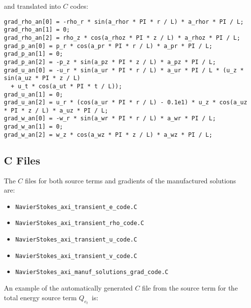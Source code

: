 \documentclass[10pt]{article}
\begin{document}
 and translated into $C$ codes:
\begin{small}
 \begin{verbatim}
grad_rho_an[0] = -rho_r * sin(a_rhor * PI * r / L) * a_rhor * PI / L;
grad_rho_an[1] = 0;
grad_rho_an[2] = rho_z * cos(a_rhoz * PI * z / L) * a_rhoz * PI / L;
grad_p_an[0] = p_r * cos(a_pr * PI * r / L) * a_pr * PI / L;
grad_p_an[1] = 0;
grad_p_an[2] = -p_z * sin(a_pz * PI * z / L) * a_pz * PI / L;
grad_u_an[0] = -u_r * sin(a_ur * PI * r / L) * a_ur * PI / L * (u_z * sin(a_uz * PI * z / L)
  + u_t * cos(a_ut * PI * t / L));
grad_u_an[1] = 0;
grad_u_an[2] = u_r * (cos(a_ur * PI * r / L) - 0.1e1) * u_z * cos(a_uz * PI * z / L) * a_uz * PI / L;
grad_w_an[0] = -w_r * sin(a_wr * PI * r / L) * a_wr * PI / L;
grad_w_an[1] = 0;
grad_w_an[2] = w_z * cos(a_wz * PI * z / L) * a_wz * PI / L;
\end{verbatim}
\end{small}


\subsection{C Files}
The $C$ files for both source terms and gradients of the  manufactured solutions are:
\begin{itemize}
\item \texttt{NavierStokes\_axi\_transient\_e\_code.C}
 \item \texttt{NavierStokes\_axi\_transient\_rho\_code.C}
 \item \texttt{NavierStokes\_axi\_transient\_u\_code.C}
 \item \texttt{NavierStokes\_axi\_transient\_v\_code.C}
 \item \texttt{NavierStokes\_axi\_manuf\_solutions\_grad\_code.C}
\end{itemize}

An example of the automatically generated $C$ file from the source term for the total energy source term $Q_{e_t}$~is:
\end{document}
